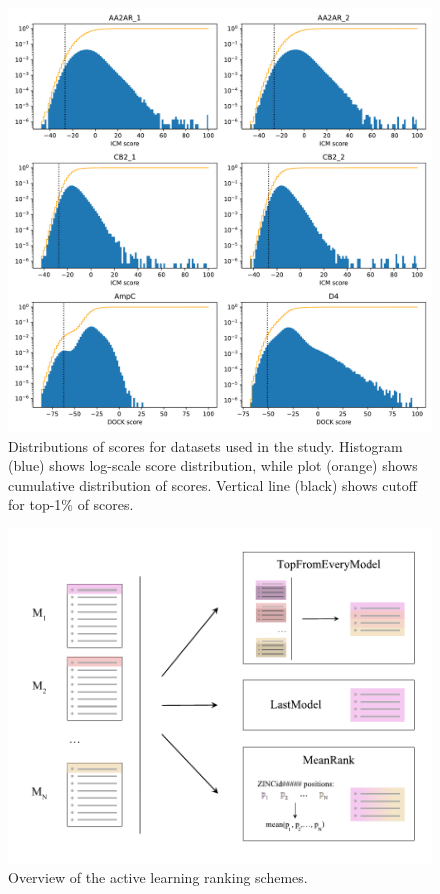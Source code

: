 \begin{figure}[ht]
\centering
\includegraphics[width=1.0\textwidth]{figures/figure_1_scores_distribution_v3.pdf}
\caption{Distributions of scores for datasets used in the study. Histogram (blue) shows log-scale score distribution, while plot (orange) shows cumulative distribution of scores. Vertical line (black) shows cutoff for top-1\% of scores.}
\label{fig:fig_1_distribution}
\end{figure}


\begin{figure}[ht]
\centering
\includegraphics[width=1.0\textwidth]{figures/Figure_2_v4.pdf}
\caption{Overview of the active learning ranking schemes.}
\label{fig:fig_2_scheme}
\end{figure}


